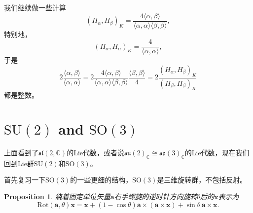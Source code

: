 \documentclass[8pt]{book}
\theoremstyle{plain}
\newtheorem{pro}[defi]{Proposition}
\newtheorem{theo}[defi]{Theorem}
\newcommand{\cc}{\mathbb{C}}
\newcommand{\lag}{{\mathfrak{g}}}  %
\begin{document}
我们继续做一些计算
\[
(H_\alpha,H_\beta)_K=\frac{4\langle \alpha,\beta \rangle}{\langle \alpha,\alpha \rangle\langle \beta,\beta \rangle},
\]
特别地，
\[
(H_\alpha,H_\alpha)_K=\frac{4}{\langle \alpha,\alpha \rangle},
\]
于是
\[
	2\frac{\langle \alpha,\beta \rangle}{\langle \alpha,\alpha \rangle}=2\frac{4\langle \alpha,\beta \rangle}{\langle \alpha,\alpha \rangle\langle \beta,\beta \rangle}\frac{\langle \beta,\beta \rangle}{4}=2\frac{(H_\alpha,H_\beta)_K}{(H_\beta,H_\beta)_K}
\]
都是整数。

\section{$\mathrm{SU}(2)$ and $\mathrm{SO}(3)$}
上面看到了$\mathfrak{sl}(2,\mathbb{C})$的Lie代数，或者说$\mathfrak{su}(2)_\cc\cong\mathfrak{so}(3)_\cc$的Lie代数，现在我们回到Lie群$\mathrm{SU}(2)$和$\mathrm{SO}(3)$。

首先复习一下$\mathrm{SO}(3)$的一些更细的结构，$\mathrm{SO}(3)$是三维旋转群，不包括反射。

\begin{pro}
绕着固定单位矢量$\mathbf{a}$右手螺旋的逆时针方向旋转$\theta$后的$\mathbf{x}$表示为
\[
\mathrm{Rot}(\mathbf{a},\theta)\mathbf{x}=\mathbf{x}+(1-\cos\theta)\mathbf{a}\times(\mathbf{a}\times\mathbf{x})+
\sin\theta\,\mathbf{a}\times\mathbf{x}.
\]
\end{pro}
\end{document}
